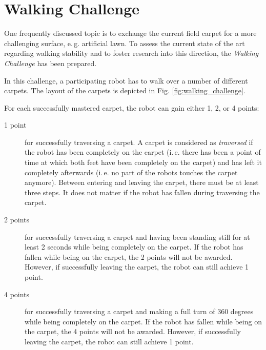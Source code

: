 \documentclass[12pt]{article}
\newcommand{\ie}{\mbox{i.\,e.}\xspace}
\newcommand{\eg}{\mbox{e.\,g.}\xspace}
\begin{document}
\newpage






\section{Walking Challenge}

One frequently discussed topic is to exchange the current field carpet for a more challenging surface, \eg artificial lawn.
To assess the current state of the art regarding walking stability and to foster research into this direction, the \textit{Walking Challenge} has been prepared.

In this challenge, a participating robot has to walk over a number of different carpets. The layout of the carpets is depicted in Fig. \ref{fig:walking_challenge}.

For each successfully mastered carpet, the robot can gain either 1, 2, or 4 points: 

\begin{description}
\item[1 point] for successfully traversing a carpet. A carpet is considered as \textit{traversed} if the robot has been completely on the carpet (\ie there has been a point of time at which both feet have been completely on the carpet) and has left it completely afterwards (\ie no part of the robots touches the carpet anymore). Between entering and leaving the carpet, there must be at least three steps. It does not matter if the robot has fallen during traversing the carpet.
\item[2 points] for successfully traversing a carpet and having been standing still for at least 2 seconds while being completely on the carpet. If the robot has fallen while being on the carpet, the 2 points will not be awarded. However, if successfully leaving the carpet, the robot can still achieve 1 point.
\item[4 points] for successfully traversing a carpet and making a full turn of 360 degrees while being completely on the carpet. If the robot has fallen while being on the carpet, the 4 points will not be awarded. However, if successfully leaving the carpet, the robot can still achieve 1 point.
\end{description}
\end{document}
